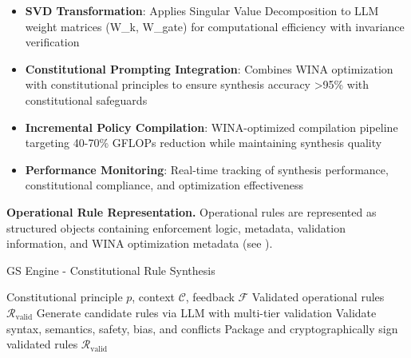 \documentclass[manuscript,screen,review,anonymous,9pt]{acmart}
\begin{document}
\begin{itemize}
    \item \textbf{SVD Transformation}: Applies Singular Value Decomposition to LLM weight matrices (W\_k, W\_gate) for computational efficiency with invariance verification \cite{SVDOptimization2024}
    \item \textbf{Constitutional Prompting Integration}: Combines WINA optimization with constitutional principles to ensure synthesis accuracy >95\% with constitutional safeguards \cite{ConstitutionalCompliance2024}
    \item \textbf{Incremental Policy Compilation}: WINA-optimized compilation pipeline targeting 40-70\% GFLOPs reduction while maintaining synthesis quality
    \item \textbf{Performance Monitoring}: Real-time tracking of synthesis performance, constitutional compliance, and optimization effectiveness \cite{PerformanceMonitoring2024}
\end{itemize}

\textbf{Operational Rule Representation.} Operational rules are represented as structured objects containing enforcement logic, metadata, validation information, and WINA optimization metadata (see ).

\begin{algorithm}[!htbp]
\caption{GS Engine - Constitutional Rule Synthesis}
\label{alg:gs_engine}
\begin{algorithmic}[1]
\Require Constitutional principle $p$, context $\mathcal{C}$, feedback $\mathcal{F}$
\Ensure Validated operational rules $\mathcal{R}_{\text{valid}}$
  \State Generate candidate rules via LLM with multi-tier validation
  \State Validate syntax, semantics, safety, bias, and conflicts
  \State Package and cryptographically sign validated rules
  \State \Return $\mathcal{R}_{\text{valid}}$
\EndFunction
\end{algorithmic}
\end{algorithm}
\end{document}
